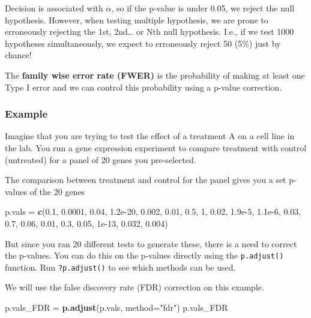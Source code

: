 \documentclass[
]{book}
\newenvironment{Shaded}{\begin{snugshade}}{\end{snugshade}}
\newcommand{\AttributeTok}[1]{\textcolor[rgb]{0.13,0.29,0.53}{#1}}
\newcommand{\DecValTok}[1]{\textcolor[rgb]{0.00,0.00,0.81}{#1}}
\newcommand{\FloatTok}[1]{\textcolor[rgb]{0.00,0.00,0.81}{#1}}
\newcommand{\FunctionTok}[1]{\textcolor[rgb]{0.13,0.29,0.53}{\textbf{#1}}}
\newcommand{\NormalTok}[1]{#1}
\newcommand{\OtherTok}[1]{\textcolor[rgb]{0.56,0.35,0.01}{#1}}
\newcommand{\StringTok}[1]{\textcolor[rgb]{0.31,0.60,0.02}{#1}}
\begin{document}
Decision is associated with \(\alpha\), so if the p-value is under 0.05, we reject the null hypothesis. However, when testing multiple hypothesis, we are prone to erroneously rejecting the 1st, 2nd\ldots{} or Nth null hypothesis. I.e., if we test 1000 hypotheses simultaneously, we expect to erroneously reject 50 (5\%) just by chance!

The \textbf{family wise error rate (FWER)} is the probability of making at least one Type I error and we can control this probability using a p-value correction.

\hypertarget{example}{%
\subsubsection{Example}\label{example}}

Imagine that you are trying to test the effect of a treatment A on a cell line in the lab. You run a gene expression experiment to compare treatment with control (untreated) for a panel of 20 genes you pre-selected.

The comparison between treatment and control for the panel gives you a set p-values of the 20 genes

\begin{Shaded}
\begin{Highlighting}[]
\NormalTok{p.vals }\OtherTok{=} \FunctionTok{c}\NormalTok{(}\FloatTok{0.1}\NormalTok{, }\FloatTok{0.0001}\NormalTok{, }\FloatTok{0.04}\NormalTok{, }\FloatTok{1.2e{-}20}\NormalTok{, }\FloatTok{0.002}\NormalTok{, }\FloatTok{0.01}\NormalTok{, }\FloatTok{0.5}\NormalTok{, }\DecValTok{1}\NormalTok{, }\FloatTok{0.02}\NormalTok{, }\FloatTok{1.9e{-}5}\NormalTok{,}
           \FloatTok{1.1e{-}6}\NormalTok{, }\FloatTok{0.03}\NormalTok{, }\FloatTok{0.7}\NormalTok{, }\FloatTok{0.06}\NormalTok{, }\FloatTok{0.01}\NormalTok{, }\FloatTok{0.3}\NormalTok{, }\FloatTok{0.05}\NormalTok{, }\FloatTok{1e{-}13}\NormalTok{, }\FloatTok{0.032}\NormalTok{, }\FloatTok{0.004}\NormalTok{)}
\end{Highlighting}
\end{Shaded}

But since you ran 20 different tests to generate these, there is a need to correct the p-values. You can do this on the p-values directly using the \texttt{p.adjust()} function. Run \texttt{?p.adjust()} to see which methods can be used.

We will use the false discovery rate (FDR) correction on this example.

\begin{Shaded}
\begin{Highlighting}[]
\NormalTok{p.vals\_FDR }\OtherTok{=} \FunctionTok{p.adjust}\NormalTok{(p.vals, }\AttributeTok{method=}\StringTok{"fdr"}\NormalTok{)}
\NormalTok{p.vals\_FDR}
\end{Highlighting}
\end{Shaded}
\end{document}
